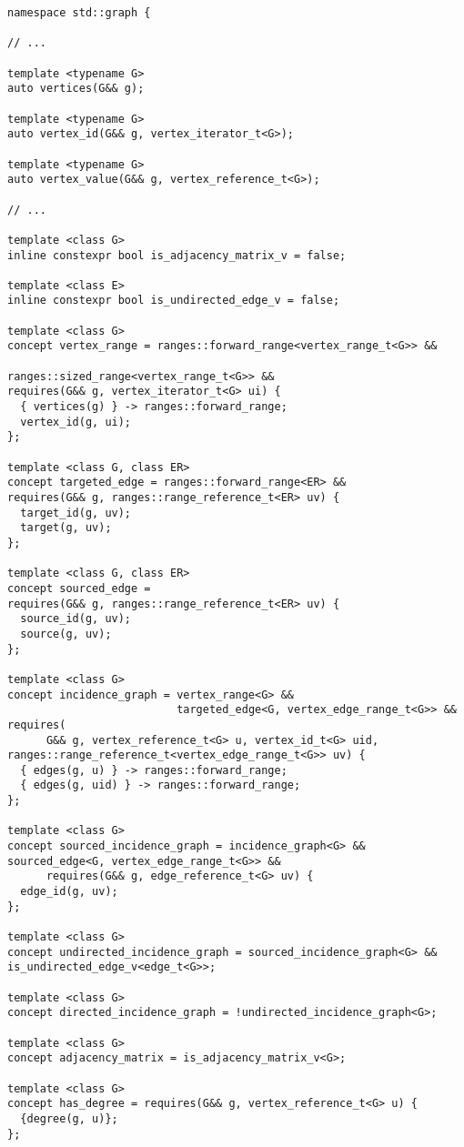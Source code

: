 \documentclass[10pt,onecolumn]{article}
\begin{document}
\begin{lstlisting}
namespace std::graph {

// ...

template <typename G>
auto vertices(G&& g);

template <typename G>
auto vertex_id(G&& g, vertex_iterator_t<G>);

template <typename G>
auto vertex_value(G&& g, vertex_reference_t<G>);

// ...

template <class G>
inline constexpr bool is_adjacency_matrix_v = false;

template <class E>
inline constexpr bool is_undirected_edge_v = false;

template <class G>
concept vertex_range = ranges::forward_range<vertex_range_t<G>> && 
                                   ranges::sized_range<vertex_range_t<G>> &&
requires(G&& g, vertex_iterator_t<G> ui) {
  { vertices(g) } -> ranges::forward_range;
  vertex_id(g, ui);
};

template <class G, class ER>
concept targeted_edge = ranges::forward_range<ER> && 
requires(G&& g, ranges::range_reference_t<ER> uv) {
  target_id(g, uv);
  target(g, uv);
};

template <class G, class ER>
concept sourced_edge = 
requires(G&& g, ranges::range_reference_t<ER> uv) {
  source_id(g, uv);
  source(g, uv);
};

template <class G>
concept incidence_graph = vertex_range<G> && 
                          targeted_edge<G, vertex_edge_range_t<G>> &&   
requires(
      G&& g, vertex_reference_t<G> u, vertex_id_t<G> uid, ranges::range_reference_t<vertex_edge_range_t<G>> uv) {
  { edges(g, u) } -> ranges::forward_range;
  { edges(g, uid) } -> ranges::forward_range;
};

template <class G>
concept sourced_incidence_graph = incidence_graph<G> && sourced_edge<G, vertex_edge_range_t<G>> &&
      requires(G&& g, edge_reference_t<G> uv) {
  edge_id(g, uv);
};

template <class G>
concept undirected_incidence_graph = sourced_incidence_graph<G> && is_undirected_edge_v<edge_t<G>>;

template <class G>
concept directed_incidence_graph = !undirected_incidence_graph<G>;

template <class G>
concept adjacency_matrix = is_adjacency_matrix_v<G>;

template <class G>
concept has_degree = requires(G&& g, vertex_reference_t<G> u) {
  {degree(g, u)};
};


\end{lstlisting}
\end{document}
